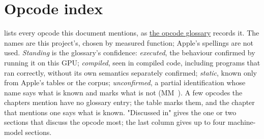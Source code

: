 \chapter{Opcode index}\label{app:c}

 lists every opcode this document mentions, as \href{https://github.com/sbryngelson/AGXForge/blob/main/isa/g17-opcode-glossary.json}{the opcode glossary} records it. The names are
this project's, chosen by measured function; Apple's spellings are not used. \emph{Standing} is the glossary's confidence:
\emph{executed}, the behaviour confirmed by running it on this GPU; \emph{compiled}, seen in compiled code, including programs that
ran correctly, without its own semantics separately confirmed; \emph{static}, known only from Apple's tables or the corpus;
\emph{unconfirmed}, a partial identification whose name says what is known and marks what is not (MM~). A few opcodes
the chapters mention have no glossary entry; the table marks them, and the chapter that mentions one says what is known.
"Discussed in" gives the one or two sections that discuss the opcode most; the last column gives up to four machine-model sections.


